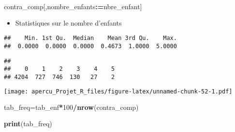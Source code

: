 \documentclass[
]{article}
\newenvironment{Shaded}{\begin{snugshade}}{\end{snugshade}}
\newcommand{\DecValTok}[1]{\textcolor[rgb]{0.00,0.00,0.81}{#1}}
\newcommand{\ErrorTok}[1]{\textcolor[rgb]{0.64,0.00,0.00}{\textbf{#1}}}
\newcommand{\KeywordTok}[1]{\textcolor[rgb]{0.13,0.29,0.53}{\textbf{#1}}}
\newcommand{\NormalTok}[1]{#1}
\newcommand{\OperatorTok}[1]{\textcolor[rgb]{0.81,0.36,0.00}{\textbf{#1}}}
\providecommand{\tightlist}{%
  \setlength{\itemsep}{0pt}\setlength{\parskip}{0pt}}
\begin{document}
\begin{Shaded}
\begin{Highlighting}[]
\NormalTok{contra_comp[,nombre_enfants}\OperatorTok{:}\ErrorTok{=}\NormalTok{nbre_enfant]}
\end{Highlighting}
\end{Shaded}

\begin{itemize}
\tightlist
\item
  Statistiques sur le nombre d'enfants
\end{itemize}

\begin{Shaded}
\end{Shaded}

\begin{verbatim}
##    Min. 1st Qu.  Median    Mean 3rd Qu.    Max. 
##  0.0000  0.0000  0.0000  0.4673  1.0000  5.0000
\end{verbatim}

\begin{Shaded}
\end{Shaded}

\begin{verbatim}
## 
##    0    1    2    3    4    5 
## 4204  727  746  130   27    2
\end{verbatim}

\begin{Shaded}
\end{Shaded}

\texttt{[image: apercu\_Projet\_R\_files/figure-latex/unnamed-chunk-52-1.pdf]}

\begin{Shaded}
\begin{Highlighting}[]
\NormalTok{tab_freq=tab_enf}\OperatorTok{*}\DecValTok{100}\OperatorTok{/}\KeywordTok{nrow}\NormalTok{(contra_comp)}

\KeywordTok{print}\NormalTok{(tab_freq)}
\end{Highlighting}
\end{Shaded}
\end{document}
